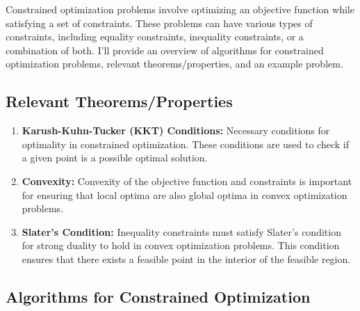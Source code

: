 \documentclass[a4paper]{article}
\begin{document}
Constrained optimization problems involve optimizing an objective function while satisfying a set of constraints. These problems can have various types of constraints, including equality constraints, inequality constraints, or a combination of both. I'll provide an overview of algorithms for constrained optimization problems, relevant theorems/properties, and an example problem.

\subsection{Relevant Theorems/Properties}

\begin{enumerate}
\item \textbf{Karush-Kuhn-Tucker (KKT) Conditions:} Necessary conditions for optimality in constrained optimization. These conditions are used to check if a given point is a possible optimal solution.

\item \textbf{Convexity:} Convexity of the objective function and constraints is important for ensuring that local optima are also global optima in convex optimization problems.

\item \textbf{Slater's Condition:} Inequality constraints must satisfy Slater's condition for strong duality to hold in convex optimization problems. This condition ensures that there exists a feasible point in the interior of the feasible region.
\end{enumerate}

\subsection{Algorithms for Constrained Optimization}
\end{document}
